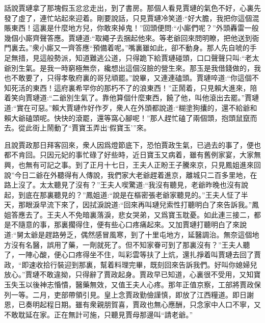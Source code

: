 

\begin{parag}
    話說賈璉拿了那塊假玉忿忿走出，到了書房。那個人看見賈璉的氣色不好，心裏先發了虛了，連忙站起來迎着。剛要說話，只見賈璉冷笑道:“好大膽，我把你這個混賬東西！這裏是什麼地方兒，你敢來掉鬼！”回頭便問:“小廝們呢？”外頭轟雷一般幾個小廝齊聲答應。賈璉道:“取繩子去捆起他來。等老爺回來問明瞭，把他送到衙門裏去。”衆小廝又一齊答應“預備着呢。”嘴裏雖如此，卻不動身。那人先自唬的手足無措，見這般勢派，知道難逃公道，只得跪下給賈璉碰頭，口口聲聲只叫:“老太爺別生氣。是我一時窮極無奈，纔想出這個沒臉的營生來。那玉是我借錢做的，我也不敢要了，只得孝敬府裏的哥兒頑罷。”說畢，又連連磕頭。賈璉啐道:“你這個不知死活的東西！這府裏希罕你的那朽不了的浪東西！”正鬧着，只見賴大進來，陪着笑向賈璉道:“二爺別生氣了。靠他算個什麼東西，饒了他，叫他滾出去罷。”賈璉道:“實在可惡。”賴大賈璉作好作歹，衆人在外頭都說道:“糊塗狗攮的，還不給爺和賴大爺磕頭呢。快快的滾罷，還等窩心腳呢！”那人趕忙磕了兩個頭，抱頭鼠竄而去。從此街上鬧動了“賈寶玉弄出‘假寶玉’”來。
\end{parag}


\begin{parag}
    且說賈政那日拜客回來，衆人因爲燈節底下，恐怕賈政生氣，已過去的事了，便也都不肯回。只因元妃的事忙碌了好些時，近日寶玉又病着，雖有舊例家宴，大家無興，也無有可記之事。到了正月十七日，王夫人正盼王子騰來京，只見鳳姐進來回說”今日二爺在外聽得有人傳說，我們家大老爺趕着進京，離城只二百多里地，在路上沒了。太太聽見了沒有？”王夫人喫驚道:“我沒有聽見，老爺昨晚也沒有說起，到底在那裏聽見的？”鳳姐道:“說是在樞密張老爺家聽見的。”王夫人怔了半天，那眼淚早流下來了，因拭淚說道:“回來再叫璉兒索性打聽明白了來告訴我。”鳳姐答應去了。王夫人不免暗裏落淚，悲女哭弟，又爲寶玉耽憂。如此連三接二，都是不隨意的事，那裏擱得住，便有些心口疼痛起來。又加賈璉打聽明白了來說道:“舅太爺是趕路勞乏，偶然感冒風寒，到了十里屯地方，延醫調治。無奈這個地方沒有名醫，誤用了藥，一劑就死了。但不知家眷可到了那裏沒有？”王夫人聽了，一陣心酸，便心口疼得坐不住，叫彩雲等扶了上炕，還扎掙着叫賈璉去回了賈政，“即速收拾行裝迎到那裏，幫着料理完畢，既刻回來告訴我們。好叫你媳婦兒放心。”賈璉不敢違拗，只得辭了賈政起身。賈政早已知道，心裏很不受用，又知寶玉失玉以後神志惛憒，醫藥無效，又值王夫人心疼。那年正值京察，工部將賈政保列一等。二月，吏部帶領引見。皇上念賈政勤儉謹慎，即放了江西糧道。即日謝恩，已奏明起程日期。雖有衆親朋賀喜，賈政也無心應酬，只念家中人口不寧，又不敢耽延在家。正在無計可施，只聽見賈母那邊叫“請老爺。”
\end{parag}


